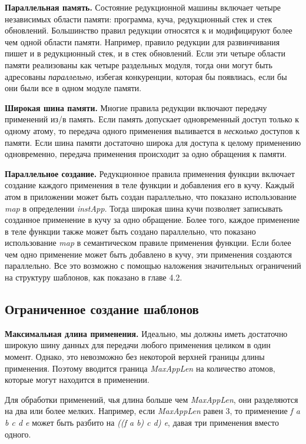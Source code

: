 \documentclass[flenqn, 14pt]{extarticle}
\begin{document}
\textbf{Параллельная память.} Состояние редукционной машины включает четыре независимых области памяти: программа, куча, редукционный стек и стек обновлений. Большинство правил редукции относятся к и модифицируют более чем одной области памяти. Например, правило редукции для развинчивания пишет и в редукционный стек, и в стек обновлений. Если эти четыре области памяти реализованы как четыре раздельных модуля, тогда они могут быть адресованы \textit{параллельно}, избегая конкуренции, которая бы появлиась, если бы они были все в одном модуле памяти.

\textbf{Широкая шина памяти.} Многие правила редукции включают передачу применений из/в память. Если память допускает одновременный доступ только к одному атому, то передача одного применения выливается в \textit{несколько} доступов к памяти. Если шина памяти достаточно широка для доступа к целому применению одновременно, передача применения происходит за одно обращения к памяти.

\textbf{Параллельное создание.} Редукционное правила применения функции включает создание каждого применения в теле функции и добавления его в кучу. Каждый атом в приложении может быть создан параллельно, что показано использование \textit{map} в определении \textit{instApp}. Тогда широкая шина кучи позволяет записывать созданное применение в кучу за одно обращение. Более того, каждое применение в теле функции также может быть создано параллельно, что показано использование \textit{map} в семантическом правиле применения функции. Если более чем одно применение может быть добавлено в кучу, эти применения создаются параллельно. Все это возможно с помощью наложения значительных ограничений на структуру шаблонов, как показано в главе 4.2.

\subsection{Ограниченное создание шаблонов}
\textbf{Максимальная длина применения.} Идеально, мы должны иметь достаточно широкую шину данных для передачи любого применения целиком в один момент. Однако, это невозможно без некоторой верхней границы длины применения. Поэтому вводится граница \textit{MaxAppLen} на количество атомов, которые могут находится в применении.

Для обработки применений, чья длина больше чем \textit{MaxAppLen}, они разделяются на два или более мелких. Например, если \textit{MaxAppLen} равен 3, то применение \textit{f a b c d e} может быть разбито на \textit{((f a b) c d) e}, давая три применения вместо одного. 
\end{document}
